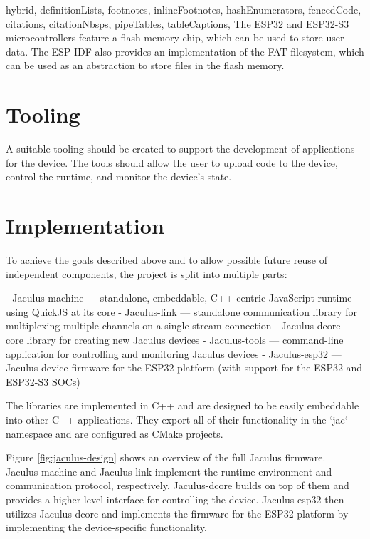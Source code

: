 \begin{markdown*}{%
  hybrid,
  definitionLists,
  footnotes,
  inlineFootnotes,
  hashEnumerators,
  fencedCode,
  citations,
  citationNbsps,
  pipeTables,
  tableCaptions,
}
The ESP32 and ESP32-S3 microcontrollers feature a flash memory chip, which can be used to store user data. The ESP-IDF also provides an implementation of the FAT filesystem, which can be used as an abstraction to store files in the flash memory.

\section{Tooling}

A suitable tooling should be created to support the development of applications for the device. The tools should allow the user to upload code to the device, control the runtime, and monitor the device's state.

\section{Implementation}


To achieve the goals described above and to allow possible future reuse of independent components, the project is split into multiple parts:

  - Jaculus-machine --- standalone, embeddable, C++ centric JavaScript runtime using QuickJS at its core
  - Jaculus-link --- standalone communication library for multiplexing multiple channels on a single stream connection
  - Jaculus-dcore --- core library for creating new Jaculus devices
  - Jaculus-tools --- command-line application for controlling and monitoring Jaculus devices
  - Jaculus-esp32 --- Jaculus device firmware for the ESP32 platform (with support for the ESP32 and ESP32-S3 SOCs)

The libraries are implemented in C++ and are designed to be easily embeddable into other C++ applications. They export all of their functionality in the `jac` namespace and are configured as CMake projects.

Figure \ref{fig:jaculus-design} shows an overview of the full Jaculus firmware. Jaculus-machine and Jaculus-link implement the runtime environment and communication protocol, respectively. Jaculus-dcore builds on top of them and provides a higher-level interface for controlling the device. Jaculus-esp32 then utilizes Jaculus-dcore and implements the firmware for the ESP32 platform by implementing the device-specific functionality.


\end{markdown*}

